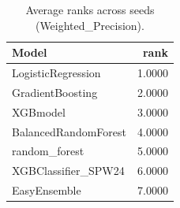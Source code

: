 \begin{table}[t]
\centering
\begin{tabular}{lr}
\toprule
Model & rank \\
\midrule
LogisticRegression & 1.0000 \\
GradientBoosting & 2.0000 \\
XGBmodel & 3.0000 \\
BalancedRandomForest & 4.0000 \\
random_forest & 5.0000 \\
XGBClassifier_SPW24 & 6.0000 \\
EasyEnsemble & 7.0000 \\
\bottomrule
\end{tabular}
\caption{Average ranks across seeds (Weighted_Precision).}
\label{tab:avg_rank_Weighted_Precision}
\end{table}